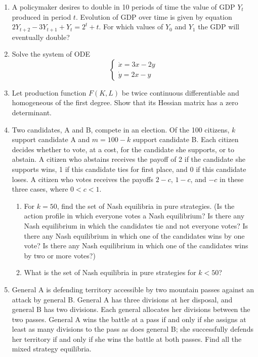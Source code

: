 \documentclass[a4paper]{article}
\begin{document}
\begin{enumerate}

\item A policymaker desires to double in 10 periods of time the value of GDP $Y_t$ produced in period $t$. Evolution of GDP over time is given by equation $2Y_{t+2}-3Y_{t+1}+Y_t=2^t+t$. For which values of $Y_0$ and $Y_1$ the GDP will eventually double?


\item  Solve the system of ODE
\[
\begin{cases}
\dot{x}=3x-2y \\
\dot{y}=2x-y
\end{cases}
\]




\item  Let production function $F(K, L)$ be twice continuous differentiable and homogeneous of the first degree. Show that its Hessian matrix has a zero determinant.

\item  Two candidates, A and B, compete in an election. Of the 100 citizens, $k$ support candidate A and $m= 100 - k$ support candidate B. Each citizen decides whether to vote, at a cost, for the candidate she supports, or to abstain. A citizen who abstains receives the payoff of 2 if the candidate she supports wins, 1 if this candidate ties for first place, and 0 if this candidate loses. A citizen who votes receives the payoffs $2 - c$, $1 - c$, and $-c$ in these three cases, where $0 < c < 1$.
\begin{enumerate}
\item  For $k = 50$, find the set of Nash equilibria in pure strategies. (Is the action profile in which everyone votes a Nash equilibrium? Is there any Nash equilibrium in which the candidates tie and not everyone votes? Is there any Nash equilibrium in which one of the candidates wins by one vote? Is there any Nash equilibrium in which one of the candidates wins by two or more votes?)
\item  What is the set of Nash equilibria in pure strategies for $k < 50$?
\end{enumerate} 

\item General A is defending territory accessible by two mountain passes against an attack by general B. General A has three divisions at her disposal, and general B has two divisions. Each general allocates her divisions between the two passes. General A wins the battle at a pass if and only if she assigns at least as many divisions to the pass as does general B; she successfully defends her territory if and only if she wins the battle at both passes. Find all the mixed strategy equilibria.


\end{enumerate}
\end{document}
